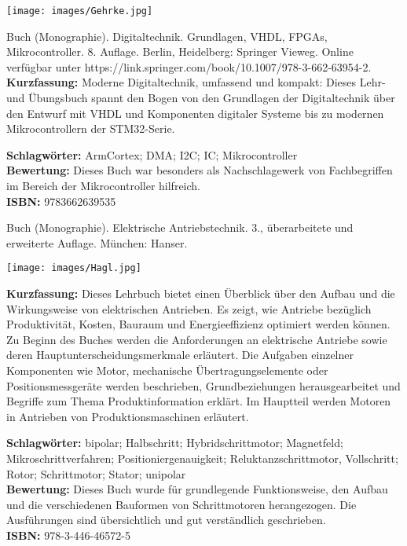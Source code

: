 {
\begin{minipage}{0.38\textwidth}
	\texttt{[image: images/Gehrke.jpg]}
\end{minipage}
\hfill
\begin{minipage}{0.6\textwidth}
Buch (Monographie). Digitaltechnik. Grundlagen, VHDL, FPGAs, Mikrocontroller.
8. Auflage. Berlin, Heidelberg: Springer Vieweg. Online verfügbar unter https://link.springer.com/book/10.1007/978-3-662-63954-2.
\\ \textbf{Kurzfassung:}
Moderne Digitaltechnik, umfassend und kompakt: Dieses Lehr- und Übungsbuch spannt den Bogen von den Grundlagen der Digitaltechnik über den Entwurf mit VHDL und Komponenten digitaler Systeme bis zu modernen Mikrocontrollern der STM32-Serie.	
\end{minipage}
\textbf{Schlagwörter:}
ArmCortex; DMA; I2C; IC; Mikrocontroller
\\ \textbf{Bewertung:}
Dieses Buch war besonders als Nachschlagewerk von Fachbegriffen im Bereich der Mikrocontroller hilfreich.
\\ \textbf{ISBN:}
9783662639535
}

{
Buch (Monographie). Elektrische Antriebstechnik.
3., überarbeitete und erweiterte Auflage. München: Hanser. \\
\begin{minipage}{0.38\textwidth}
	\texttt{[image: images/Hagl.jpg]}
\end{minipage}
\hfill
\begin{minipage}{0.6\textwidth}
\textbf{Kurzfassung:}
Dieses Lehrbuch bietet einen Überblick über den Aufbau und die Wirkungsweise von elektrischen Antrieben. Es zeigt, wie Antriebe bezüglich Produktivität, Kosten, Bauraum und Energieeffizienz optimiert werden können. Zu Beginn des Buches werden die Anforderungen an elektrische Antriebe sowie deren Hauptunterscheidungsmerkmale erläutert. Die Aufgaben einzelner Komponenten wie Motor, mechanische Übertragungselemente oder Positionsmessgeräte werden beschrieben, Grundbeziehungen herausgearbeitet und Begriffe zum Thema Produktinformation erklärt. Im Hauptteil werden Motoren in Antrieben von Produktionsmaschinen erläutert.
\end{minipage}
\textbf{Schlagwörter:}
bipolar; Halbschritt; Hybridschrittmotor; Magnetfeld; Mikroschrittverfahren; Positioniergenauigkeit; Reluktanzschrittmotor, Vollschritt; Rotor; Schrittmotor; Stator; unipolar
\\ \textbf{Bewertung:}
Dieses Buch wurde für grundlegende Funktionsweise, den Aufbau und die verschiedenen Bauformen von Schrittmotoren herangezogen. Die Ausführungen sind übersichtlich und gut verständlich geschrieben.
\\ \textbf{ISBN:}
978-3-446-46572-5
}

